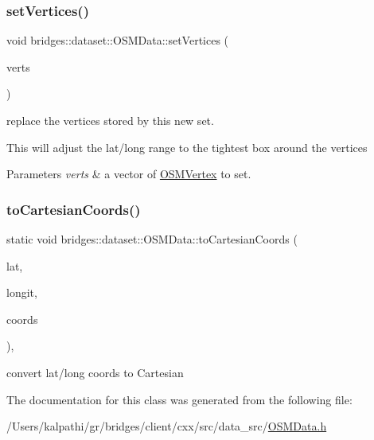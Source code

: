 \subsubsection{\texorpdfstring{set\+Vertices()}{setVertices()}}
{\footnotesize\ttfamily void bridges\+::dataset\+::\+O\+S\+M\+Data\+::set\+Vertices (\begin{DoxyParamCaption}\item[{const vector$<$ \mbox{\hyperlink{classbridges_1_1dataset_1_1_o_s_m_vertex}{O\+S\+M\+Vertex}} $>$ \&}]{verts }\end{DoxyParamCaption})\hspace{0.3cm}{\ttfamily [inline]}}



replace the vertices stored by this new set. 

This will adjust the lat/long range to the tightest box around the vertices


\begin{DoxyParams}{Parameters}
{\em verts} & a vector of \mbox{\hyperlink{classbridges_1_1dataset_1_1_o_s_m_vertex}{O\+S\+M\+Vertex}} to set. \\
\hline
\end{DoxyParams}
\mbox{\label{classbridges_1_1dataset_1_1_o_s_m_data_a519483237352f16f0405137138ee2bd1}} 
\subsubsection{\texorpdfstring{to\+Cartesian\+Coords()}{toCartesianCoords()}}
{\footnotesize\ttfamily static void bridges\+::dataset\+::\+O\+S\+M\+Data\+::to\+Cartesian\+Coords (\begin{DoxyParamCaption}\item[{double}]{lat,  }\item[{double}]{longit,  }\item[{double $\ast$}]{coords }\end{DoxyParamCaption})\hspace{0.3cm}{\ttfamily [inline]}, {\ttfamily [static]}}

convert lat/long coords to Cartesian 

The documentation for this class was generated from the following file\+:\begin{DoxyCompactItemize}
\item 
/\+Users/kalpathi/gr/bridges/client/cxx/src/data\+\_\+src/\mbox{\hyperlink{_o_s_m_data_8h}{O\+S\+M\+Data.\+h}}\end{DoxyCompactItemize}
